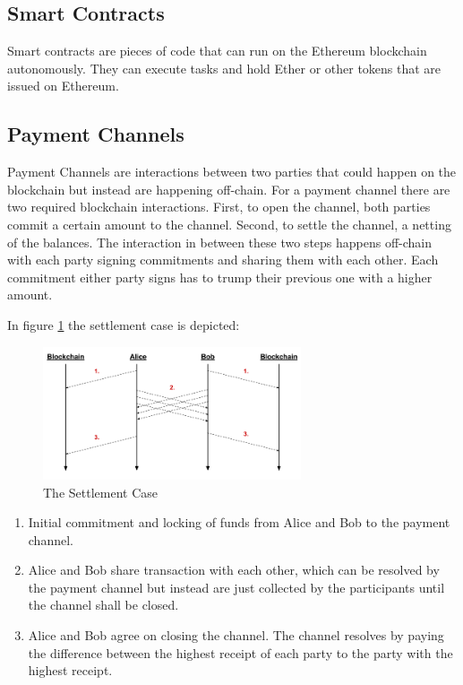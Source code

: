 \blindtext

\subsection{Smart Contracts}

Smart contracts are pieces of code that can run on the Ethereum blockchain autonomously. They can execute tasks and hold Ether or other tokens that are issued on Ethereum.

\subsection{Payment Channels}
Payment Channels are interactions between two parties that could happen on the blockchain but instead are happening off-chain. For a payment channel there are two required blockchain interactions. First, to open the channel, both parties commit a certain amount to the channel. Second, to settle the channel, a netting of the balances. The interaction in between these two steps happens off-chain with each party signing commitments and sharing them with each other. Each commitment either party signs has to trump their previous one with a higher amount. 

In figure \ref{pc_settle} the settlement case is depicted:

\begin{figure}[!t]
\centering
\includegraphics[width=3.0in]{images/settle.png}
\caption{The Settlement Case}
\label{pc_settle}
\end{figure}

\begin{enumerate}
\item Initial commitment and locking of funds from Alice and Bob to the payment channel.
\item Alice and Bob share transaction with each other, which can be resolved by the payment channel but instead are just collected by the participants until the channel shall be closed.
\item Alice and Bob agree on closing the channel. The channel resolves by paying the difference between the highest receipt of each party to the party with the highest receipt.
\end{enumerate}

